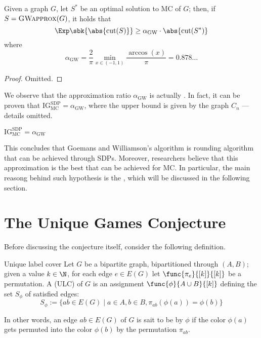 \documentclass[a4paper, 12pt]{report}
\begin{document}
    \begin{framedthm}{}
        Given a graph $G$, let $S^*$ be an optimal solution to MC of $G$; then, if $S = \textsc{GWapprox}(G)$, it holds that $$\Exp \sbk{\abs{\mathrm{cut}(S)}} \ge \alpha_{\mathrm{GW}} \cdot \abs{\mathrm{cut}(S^*)}$$ where $$\alpha_{\mathrm{GW}} = \dfrac{2}{\pi} \min_{x \in (-1, 1)}{\dfrac{\arccos(x)}{\pi}} = 0.878  \ldots$$
    \end{framedthm}

    \begin{proof}
        Omitted.
    \end{proof}

    We observe that the approximation ratio $\alpha_{\mathrm{GW}}$ is actually . In fact, it can be proven that $\mathrm{IG}_{\mathrm{MC}}^{\mathrm{SDP}} = \alpha_{\mathrm{GW}}$, where the upper bound is given by the graph $C_n$ --- details omitted.

    \begin{framedthm}{}
        $\mathrm{IG}_{\mathrm{MC}}^{\mathrm{SDP}} = \alpha_{\mathrm{GW}}$
    \end{framedthm}

    This concludes that Goemans and Williamson's algorithm is  rounding algorithm that can be achieved through SDPs. Moreover, researchers believe that this approximation is the best that can be achieved  for MC. In particular, the main reasong behind such hypothesis is the , which will be discussed in the following section.

    \section{The Unique Games Conjecture}

    Before discussing the conjecture itself, consider the following definition.

    \begin{frameddefn}{Unique label cover}
        Let $G$ be a bipartite graph, bipartitioned through $(A, B)$; given a value $k \in \N$, for each edge $e \in E(G)$ let $\func{\pi_e}{[k]}{[k]}$ be a permutation. A  (ULC) of $G$ is an assignment $\func{\phi}{A \cup B}{[k]}$ defining the set $S_\phi$ of satisfied edges: $$S_\phi := \{ab \in E(G) \mid a \in A, b \in B, \pi_{ab}(\phi(a)) = \phi(b)\}$$
    \end{frameddefn}

    In other words, an edge $ab \in E(G)$ of $G$ is sait to be  by $\phi$ if the color $\phi(a)$ gets permuted into the color $\phi(b)$ by the permutation $\pi_{ab}$.
\end{document}
